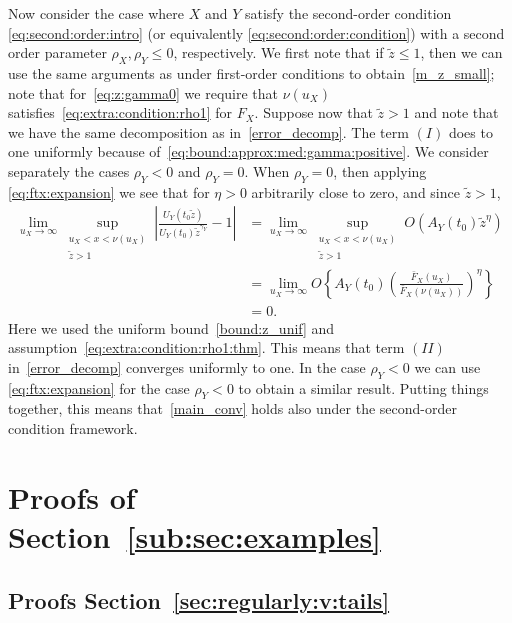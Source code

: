 \documentclass{statsoc}
\theoremstyle{break}
\newcommand{\tzero}{t_0}
\begin{document}
Now consider the case where $X$ and $Y$ satisfy the second-order condition \eqref{eq:second:order:intro} (or equivalently \eqref{eq:second:order:condition}) with a second order parameter $\rho_X,\rho_Y \leq 0$, respectively. 
We first note that if $\tilde z\leq 1$, then we can use the same arguments as under first-order conditions to obtain~\eqref{m_z_small}; note that for~\eqref{eq:z:gamma0} we require that $\nu(u_X)$ satisfies~\eqref{eq:extra:condition:rho1} for $F_X$. 
Suppose now that $\tilde z > 1$ and note that we have the same decomposition as in~\eqref{error_decomp}. The term $(I)$ does to one uniformly because of~\eqref{eq:bound:approx:med:gamma:positive}. We consider separately the cases $\rho_Y< 0$ and $\rho_Y = 0$. When $\rho_Y = 0$, then applying \eqref{eq:ftx:expansion} we see that for $\eta > 0$ arbitrarily close to zero, and since $\tilde z > 1$, 
\begin{align*}
\lim_{u_X \to \infty}	\sup_{\substack{ u_X < x < \nu(u_X) \\ \tilde z > 1 } } \left| \frac{U_Y(\tzero \tilde z)}{ U_Y(\tzero)\tilde z^{\gamma_Y}}  - 1\right| &= \lim_{u_X \to \infty} 	\sup_{\substack{ u_X < x < \nu(u_X) \\ \tilde z > 1 }  } O(A_Y(t_0) \tilde z^\eta ) \\
&= \lim_{u_X \to \infty}  O\left\{A_Y(t_0)\left( \frac{\bar F_X(u_X)}{\bar F_X(\nu(u_X))}\right)^\eta \right\}\\
& = 0.   
\end{align*}
Here we used the uniform bound~\eqref{bound:z_unif} and assumption~\eqref{eq:extra:condition:rho1:thm}. This means that term $(II)$ in~\eqref{error_decomp} converges uniformly to one. In the case $\rho_Y <  0$ we can use  \eqref{eq:ftx:expansion} for the case $\rho_Y < 0$ to obtain a similar result. Putting things together, this means that~\eqref{main_conv} holds also under the second-order condition framework.






\section{Proofs of Section~\ref{sub:sec:examples}}



\subsection{Proofs Section~\ref{sec:regularly:v:tails}}\label{proof:sec:asymptotic:dep:mod:1}
\end{document}
